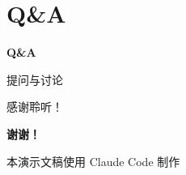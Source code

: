\documentclass[aspectratio=169,xcolor=dvipsnames]{beamer}
\begin{document}
\section{Q\&A}

\begin{frame}[plain]
  \centering
  \Huge \textbf{Q\&A}

  \vspace{1cm}
  \Large
  提问与讨论

  \vspace{1cm}
  \normalsize
  感谢聆听！
\end{frame}

\begin{frame}[plain]
  \centering
  \Huge \textbf{谢谢！}

  \vspace{1cm}
  \normalsize

  \vspace{0.5cm}
  \small
  本演示文稿使用 Claude Code 制作
\end{frame}
\end{document}
